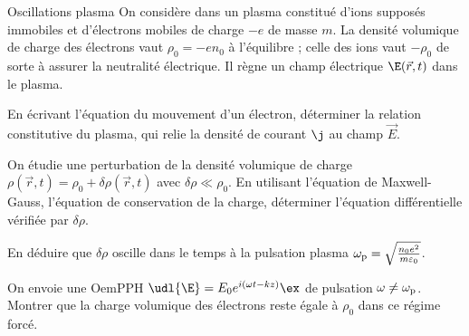 \begin{exo}[PC]{Oscillations plasma}
On considère dans un plasma constitué d'ions supposés immobiles et d'électrons mobiles de charge $-e$ de masse $m$. La densité volumique de charge des électrons vaut $\rho_0 = -e n_0$  à l’équilibre ; celle des ions vaut $-\rho_0$ de sorte à assurer la neutralité électrique. Il règne un champ électrique $\E(\Vec{r},t)$ dans le plasma.
\begin{quest}
\item En écrivant l'équation du mouvement d'un électron, déterminer la relation constitutive du plasma, qui relie la densité de courant $\j$ au champ $\Vec{E}$.
\item On étudie une perturbation de la densité volumique de charge  $\rho(\Vec{r},t)=\rho_0+\delta \rho(\Vec{r},t)$ avec $\delta \rho \ll \rho_0$.
 En utilisant l'équation de Maxwell-Gauss, l'équation de conservation de la charge,  déterminer l'équation différentielle vérifiée par $\delta \rho$.
 \item En déduire que $\delta \rho$ oscille dans le temps à la pulsation plasma $\omega_{\rm{p}}=\sqrt{\frac{n_0e^2}{m\varepsilon_0}}$.
\item On envoie une OemPPH $\udl{\E} = E_0 e^{i(\omega t - k z)}\ex$ de pulsation $\omega\neq\omega_{\rm{p}}$. Montrer que la charge volumique des électrons reste égale à $\rho_0$ dans ce régime forcé.
\end{quest}
\end{exo}

